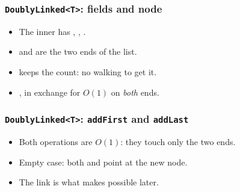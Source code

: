 \documentclass[aspectratio=169,10pt,compress]{beamer}
\begin{document}
\begin{frame}[t,fragile] \frametitle{\texttt{DoublyLinked<T>}: fields and node}
  \begin{itemize}\small
    \item The inner  has , , .
    \item {} and  are the two ends of the list.
    \item {} keeps the count: no walking to get it.
    \item {}, in exchange for
          $O(1)$ on \emph{both} ends.
  \end{itemize}
\end{frame}




\begin{frame}[t,fragile] \frametitle{\texttt{DoublyLinked<T>}: \texttt{addFirst} and \texttt{addLast}}
  \begin{itemize}\small
    \item Both operations are $O(1)$: they touch only the two ends.
    \item Empty case: both  and  point at the new node.
    \item The  link is what makes  possible later.
  \end{itemize}
\end{frame}
\end{document}

